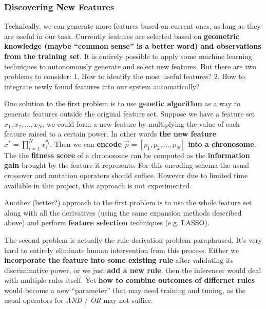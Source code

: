 \subsubsection{Discovering New Features}

Technically, we can generate more features based on current ones, as long as they are useful in our task. Currently features are selected based on \textbf{geometric knowledge (maybe ``common sense'' is a better word) and observations from the training set}. It is entirely possible to apply some machine learning techniques to autonomously generate and select new features. But there are two problems to consider: 1. How to identify the most useful features? 2. How to integrate newly found features into our system automatically?

One solution to the first problem is to use \textbf{genetic algorithm} as a way to generate features outside the original feature set. Suppose we have a feature set $x_1, x_2, ..., x_N$, we could form a new feature by multiplying the value of each feature raised to a certain power. In other words \textbf{the new feature $x^{*} = \prod_{i=1}^{N} x_i^{p_i}$}. Then we can \textbf{encode $\vec{p} = [p_1, p_2, ..., p_N]$ into a chronosome}. The the \textbf{fitness score} of a chronosome can be computed as the \textbf{information gain} brought by the feature it represents. For this encoding schema the usual crossover and mutation operators should suffice. However due to limited time available in this project, this approach is not experimented.

Another (better?) approach to the first problem is to use the whole feature set along with all the derivatives (using the same expansion methods described above) and perform \textbf{feature selection} techniques (e.g. LASSO).

The second problem is actually the rule derivation problem paraphrased. It's very hard to entirely eliminate human intervention from this process. Either we \textbf{incorporate the feature into some existing rule} after validating its discriminative power, or we just \textbf{add a new rule}, then the inferencer would deal with multiple rules itself. Yet \textbf{how to combine outcomes of differnet rules} would become a new ``parameter'' that may need training and tuning, as the usual operators for \textit{AND} / \textit{OR} may not suffice.

